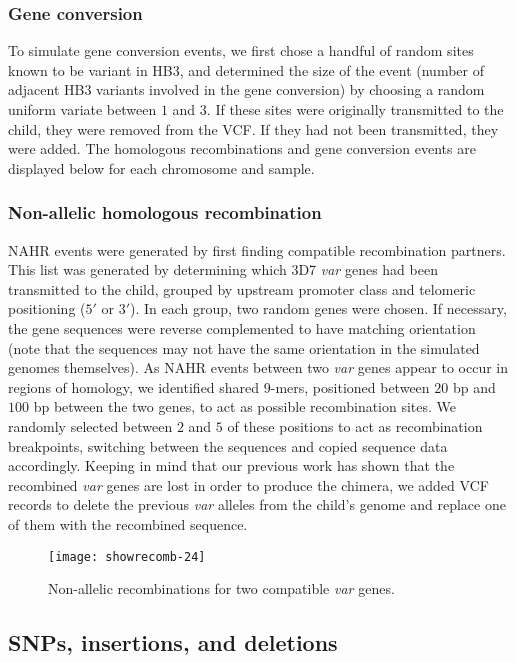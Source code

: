 \subsubsection{Gene conversion}

To simulate gene conversion events, we first chose a handful of random sites known to be variant in HB3, and determined the size of the event (number of adjacent HB3 variants involved in the gene conversion) by choosing a random uniform variate between $1$ and $3$. If these sites were originally transmitted to the child, they were removed from the VCF. If they had not been transmitted, they were added. The homologous recombinations and gene conversion events are displayed below for each chromosome and sample.

\subsubsection{Non-allelic homologous recombination}

NAHR events were generated by first finding compatible recombination partners. This list was generated by determining which 3D7 \textit{var} genes had been transmitted to the child, grouped by upstream promoter class and telomeric positioning ($5'$ or $3'$). In each group, two random genes were chosen. If necessary, the gene sequences were reverse complemented to have matching orientation (note that the sequences may not have the same orientation in the simulated genomes themselves). As NAHR events between two \textit{var} genes appear to occur in regions of homology, we identified shared $9$-mers, positioned between $20$ bp and $100$ bp between the two genes, to act as possible recombination sites. We randomly selected between $2$ and $5$ of these positions to act as recombination breakpoints, switching between the sequences and copied sequence data accordingly. Keeping in mind that our previous work has shown that the recombined \textit{var} genes are lost in order to produce the chimera, we added VCF records to delete the previous \textit{var} alleles from the child's genome and replace one of them with the recombined sequence.

\begin{figure}[h!]
  \centering
    \texttt{[image: showrecomb-24]}
  \caption{Non-allelic recombinations for two compatible \textit{var} genes.}
  \label{fig:showrecomb-24}
\end{figure}

\subsection{SNPs, insertions, and deletions}

